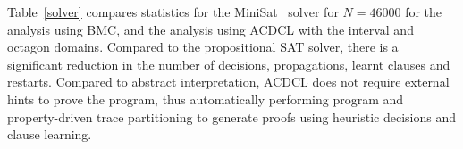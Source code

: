 Table~\ref{solver} compares statistics for the MiniSat~\cite{minisat}
solver for $N=46000$ for the analysis using BMC, and the analysis using
ACDCL with the interval and octagon domains.  Compared to the propositional
SAT solver, there is a significant reduction in the number of decisions,
propagations, learnt clauses and restarts.  Compared to abstract
interpretation, ACDCL does not require external hints to prove the program,
thus automatically performing program and property-driven trace partitioning
to generate proofs using heuristic decisions and clause learning.
